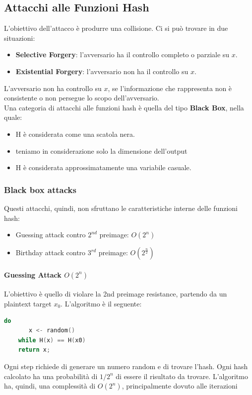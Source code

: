 \documentclass[a4paper,12pt]{article}
\begin{document}
\subsection{Attacchi alle Funzioni Hash}
L'obiettivo dell'attacco è produrre una collisione. Ci si può trovare in due situazioni:
\begin{itemize}
	\item \textbf{Selective Forgery}: l'avversario ha il controllo completo o parziale su $x$.
	\item \textbf{Existential Forgery}: l'avversario non ha il controllo su $x$.
\end{itemize}
L'avversario non ha controllo su $x$, se l'informazione che rappresenta non è consistente o non persegue lo scopo dell'avversario. \\
Una categoria di attacchi alle funzioni hash è quella del tipo \textbf{Black Box}, nella quale:
\begin{itemize}
	\item H è considerata come una scatola nera.
	\item teniamo in considerazione solo la dimensione dell'output
	\item H è considerata approssimatamente una variabile casuale.
\end{itemize}
\subsubsection{Black box attacks}
Questi attacchi, quindi, non sfruttano le caratteristiche interne delle funzioni hash:
\begin{itemize}
	\item Guessing attack contro $2^{nd}$ preimage: $O(2^n)$
	\item Birthday attack contro $3^{rd}$ preimage: $O(2^{\frac{n}{2}})$
\end{itemize}

\paragraph{Guessing Attack $O(2^n)$} 
L'obiettivo è quello di violare la 2nd preimage resistance, partendo da un plaintext target $x_0$.
L'algoritmo è il seguente:
\begin{center}
\begin{lstlisting}[language=C]
	do 
	   x <- random()
	while H(x) == H(x0)
	return x;
\end{lstlisting}
\end{center}
Ogni step richiede di generare un numero random e di trovare l'hash.
Ogni hash calcolato ha una probabilità di $1/2^n$ di essere il risultato da trovare. 
L'algoritmo ha, quindi, una complessità di $O(2^n)$, principalmente dovuto alle iterazioni
\end{document}
